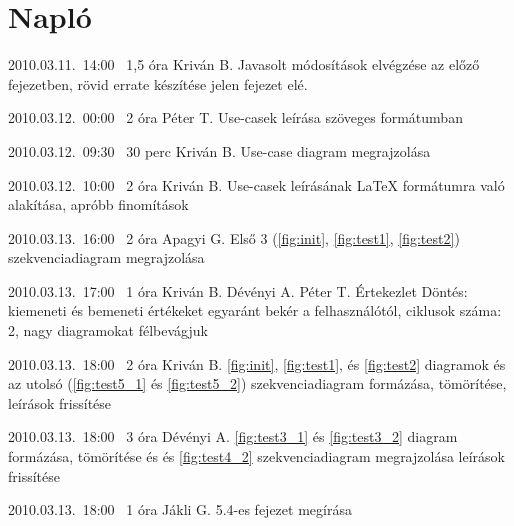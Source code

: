 %
\section{Napló}

\begin{naplo}

\bejegyzes
{2010.03.11.~14:00~}
{1,5 óra}
{Kriván B.}
{Javasolt módosítások elvégzése az előző fejezetben, rövid errate készítése jelen fejezet elé.}

\bejegyzes
{2010.03.12.~00:00~}
{2 óra}
{Péter T.}
{Use-casek leírása szöveges formátumban}

\bejegyzes
{2010.03.12.~09:30~}
{30 perc}
{Kriván B.}
{Use-case diagram megrajzolása}

\bejegyzes
{2010.03.12.~10:00~}
{2 óra}
{Kriván B.}
{Use-casek leírásának \LaTeX{} formátumra való alakítása, apróbb finomítások}

\bejegyzes
{2010.03.13.~16:00~}
{2 óra}
{Apagyi G.}
{Első 3 (\ref{fig:init}, \ref{fig:test1}, \ref{fig:test2}) szekvenciadiagram megrajzolása}

\bejegyzes
{2010.03.13.~17:00~}
{1 óra}
{Kriván B.\newline
Dévényi A.\newline
Péter T.}
{Értekezlet\newline
Döntés: kiemeneti és bemeneti értékeket egyaránt bekér a felhasználótól, ciklusok száma: 2, nagy diagramokat félbevágjuk}

\bejegyzes
{2010.03.13.~18:00~}
{2 óra}
{Kriván B.}
{\ref{fig:init}, \ref{fig:test1}, és \ref{fig:test2} diagramok és az utolsó (\ref{fig:test5_1} és \ref{fig:test5_2}) szekvenciadiagram formázása, tömörítése, leírások frissítése}

\bejegyzes
{2010.03.13.~18:00~}
{3 óra}
{Dévényi A.}
{\ref{fig:test3_1} és \ref{fig:test3_2} diagram formázása, tömörítése és  és \ref{fig:test4_2} szekvenciadiagram megrajzolása leírások frissítése}

\bejegyzes
{2010.03.13.~18:00~}
{1 óra}
{Jákli G.}
{5.4-es fejezet megírása}

\end{naplo}

